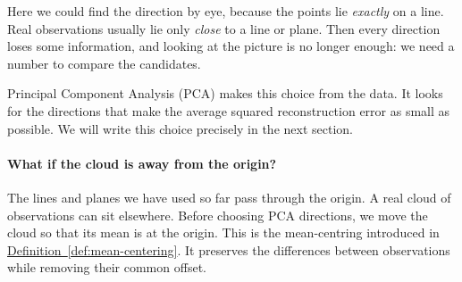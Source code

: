 \documentclass[a4paper,12pt,oneside]{report}
\begin{document}
Here we could find the direction by eye, because the points lie
\emph{exactly} on a line. Real observations usually lie only
\emph{close} to a line or plane. Then every direction loses some
information, and looking at the picture is no longer enough: we need
a number to compare the candidates.

Principal Component Analysis (PCA) makes this choice from the data.
It looks for the directions that make the average squared
reconstruction error as small as possible. We will write this
choice precisely in the next section.

\paragraph{What if the cloud is away from the origin?}
The lines and planes we have used so far pass through the origin.
A real cloud of observations can sit elsewhere. Before choosing
PCA directions, we move the cloud so that its mean is at the origin.
This is the mean-centring introduced in
\hyperref[def:mean-centering]{Definition~\ref*{def:mean-centering}}.
It preserves the differences between observations while removing
their common offset.
\end{document}
